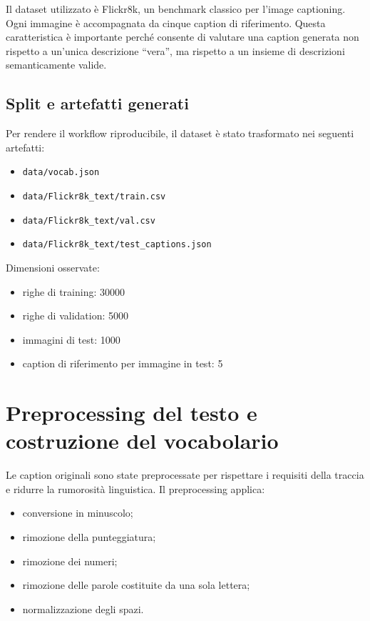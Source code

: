 \documentclass[12pt,a4paper]{article}
\begin{document}
Il dataset utilizzato è Flickr8k, un benchmark classico per l'image captioning. Ogni immagine è accompagnata da cinque caption di riferimento. Questa caratteristica è importante perché consente di valutare una caption generata non rispetto a un'unica descrizione “vera”, ma rispetto a un insieme di descrizioni semanticamente valide.

\subsection{Split e artefatti generati}

Per rendere il workflow riproducibile, il dataset è stato trasformato nei seguenti artefatti:
\begin{itemize}[leftmargin=*]
    \item \texttt{data/vocab.json}
    \item \texttt{data/Flickr8k\_text/train.csv}
    \item \texttt{data/Flickr8k\_text/val.csv}
    \item \texttt{data/Flickr8k\_text/test\_captions.json}
\end{itemize}

Dimensioni osservate:
\begin{itemize}[leftmargin=*]
    \item righe di training: 30000
    \item righe di validation: 5000
    \item immagini di test: 1000
    \item caption di riferimento per immagine in test: 5
\end{itemize}

\section{Preprocessing del testo e costruzione del vocabolario}

Le caption originali sono state preprocessate per rispettare i requisiti della traccia e ridurre la rumorosità linguistica. Il preprocessing applica:
\begin{itemize}[leftmargin=*]
    \item conversione in minuscolo;
    \item rimozione della punteggiatura;
    \item rimozione dei numeri;
    \item rimozione delle parole costituite da una sola lettera;
    \item normalizzazione degli spazi.
\end{itemize}
\end{document}
